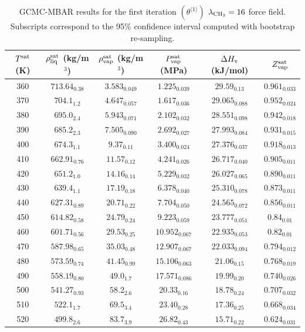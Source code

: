 \documentclass[journal=jctc,manuscript=article]{achemso}
\begin{document}
	\begin{table}[htb!]
		\caption{GCMC-MBAR results for the first iteration $(\theta^{\langle1\rangle})$ $\lambda_{\rm CH_2} = 16$ force field. Subscripts correspond to the 95\% confidence interval computed with bootstrap re-sampling.}
		\begin{center}
			\begin{tabular}{|c|c|c|c|c|c|}
				\hline
				$T^{\rm sat}$ (K) & $\rho_{\rm liq}^{\rm sat}$ (kg/m$^3$) & $\rho_{\rm vap}^{\rm sat}$ (kg/m$^3$) & $P_{\rm vap}^{\rm sat}$ (MPa) & $\Delta H_{\rm v}$ (kJ/mol) & $Z_{\rm vap}^{\rm sat}$ \\ \hline
				360 & $713.64_{0.38}$ & $3.583_{0.049}$ & $1.225_{0.039}$ & $29.59_{0.13}$ & $0.961_{0.033}$ \\
				370 & $704.1_{1.2}$ & $4.647_{0.057}$ & $1.617_{0.036}$ & $29.065_{0.088}$ & $0.952_{0.024}$ \\
				380 & $695.0_{2.4}$ & $5.943_{0.071}$ & $2.102_{0.032}$ & $28.551_{0.098}$ & $0.942_{0.018}$ \\
				390 & $685.2_{2.3}$ & $7.505_{0.090}$ & $2.692_{0.027}$ & $27.993_{0.084}$ & $0.931_{0.015}$ \\
				400 & $674.3_{1.1}$ & $9.37_{0.11}$ & $3.400_{0.024}$ & $27.376_{0.037}$ & $0.918_{0.013}$ \\
				410 & $662.91_{0.76}$ & $11.57_{0.12}$ & $4.241_{0.026}$ & $26.717_{0.040}$ & $0.905_{0.011}$ \\
				420 & $651.2_{1.0}$ & $14.16_{0.14}$ & $5.229_{0.032}$ & $26.027_{0.065}$ & $0.890_{0.011}$ \\
				430 & $639.4_{1.1}$ & $17.19_{0.18}$ & $6.378_{0.040}$ & $25.310_{0.078}$ & $0.873_{0.011}$ \\
				440 & $627.31_{0.89}$ & $20.71_{0.22}$ & $7.704_{0.050}$ & $24.565_{0.072}$ & $0.856_{0.011}$ \\
				450 & $614.82_{0.58}$ & $24.79_{0.24}$ & $9.223_{0.059}$ & $23.777_{0.051}$ & $0.84_{0.01}$ \\
				460 & $601.71_{0.56}$ & $29.53_{0.25}$ & $10.952_{0.067}$ & $22.935_{0.053}$ & $0.82_{0.01}$ \\
				470 & $587.98_{0.65}$ & $35.03_{0.48}$ & $12.907_{0.067}$ & $22.033_{0.094}$ & $0.794_{0.012}$ \\
				480 & $573.59_{0.74}$ & $41.45_{0.99}$ & $15.106_{0.063}$ & $21.06_{0.15}$ & $0.768_{0.019}$ \\
				490 & $558.19_{0.80}$ & $49.0_{1.7}$ & $17.571_{0.086}$ & $19.99_{0.20}$ & $0.740_{0.026}$ \\
				500 & $541.27_{0.93}$ & $58.2_{2.6}$ & $20.33_{0.16}$ & $18.78_{0.24}$ & $0.707_{0.032}$ \\
				510 & $522.1_{1.7}$ & $69.5_{3.4}$ & $23.40_{0.28}$ & $17.36_{0.25}$ & $0.668_{0.034}$ \\
				520 & $499.8_{2.6}$ & $83.7_{3.9}$ & $26.82_{0.43}$ & $15.71_{0.22}$ & $0.624_{0.031}$ \\
				\hline
			\end{tabular}
		\end{center}
	\end{table}
\end{document}

